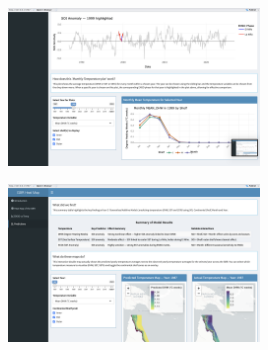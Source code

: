 \documentclass[letterpaper,9pt,twocolumn,twoside,]{pinp}
\begin{document}
\begin{center}
\includegraphics[width=0.5\textwidth]{report_images/shiny_enso_temp_b.png}
\end{center}

\begin{center}
\includegraphics[width=0.5\textwidth]{report_images/shiny_predictions.png}
\end{center}





\end{document}
